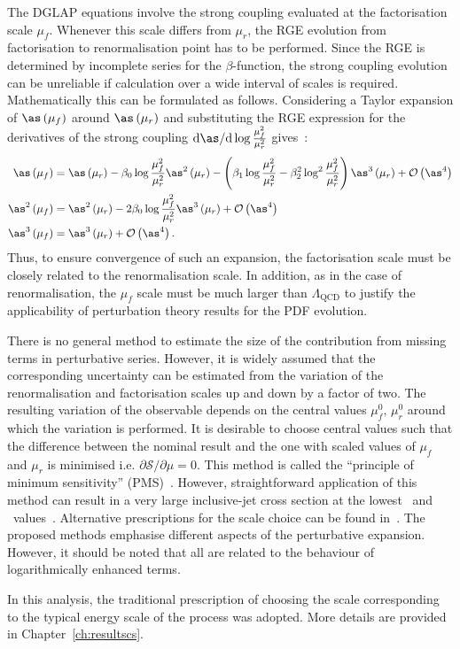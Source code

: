 The DGLAP equations involve the strong coupling evaluated at the factorisation scale $\mu_f$. Whenever this scale differs from $\mu_r$, the RGE evolution from factorisation to renormalisation point has to be performed. Since the RGE is determined by incomplete series for the $\beta$-function, the strong coupling evolution can be unreliable if calculation over a wide interval of scales is required. Mathematically this can be formulated as follows. Considering a Taylor expansion of $\as\left(\mu_f\right)$ around $\as\left(\mu_r\right)$ and substituting the RGE expression for the derivatives of the strong coupling $\mathrm{d}\as/\mathrm{d}\log{\frac{\mu_f^2}{\mu_r^2}}$ gives~\cite{Botje:2010ay}:
{\small
\begin{align}
 \as\left(\mu_f\right) &= \as\left(\mu_r\right) - \beta_0\log{\frac{\mu_f^2}{\mu_r^2}}\as^2\left(\mu_r\right) - \left(\beta_1\log{\frac{\mu_f^2}{\mu_r^2}} - \beta_2^2\log^2{\frac{\mu_f^2}{\mu_r^2}}\right)\as^3\left(\mu_r\right) + \mathcal{O}\left(\as^4\right)\\ \nonumber
 \as^2\left(\mu_f\right) & = \as^2\left(\mu_r\right) - 2\beta_0\log{\frac{\mu_f^2}{\mu_r^2}}\as^3\left(\mu_r\right) + \mathcal{O}\left(\as^4\right)\\
\as^3\left(\mu_f\right) & = \as^3\left(\mu_r\right) + \mathcal{O}\left(\as^4\right).
\end{align}
}
Thus, to ensure convergence of such an expansion, the factorisation scale must be closely related to the renormalisation scale. In addition, as in the case of renormalisation, the $\mu_f$ scale must be much larger than $\Lambda_\mathrm{QCD}$ to justify the applicability of perturbation theory results for the PDF evolution.

There is no general method to estimate the size of the contribution from missing terms in perturbative series. However, it is widely assumed that the corresponding uncertainty can be estimated from the variation of the renormalisation and factorisation scales up and down by a factor of two. The resulting variation of the observable depends on the central values $\mu_{f}^{0},\,\mu_{r}^{0}$ around which the variation is performed. It is desirable to choose central values such that the difference between the nominal result and the one with scaled values of $\mu_f$ and $\mu_r$ is minimised i.e. $\partial\mathcal{S}/\partial\mu=0$. This method is called the ``principle of minimum sensitivity'' (PMS)~\cite{Stevenson:1980du}. However, straightforward application of this method can result in a very large inclusive-jet cross section at the lowest \qsq~and \etjet~values~\cite{thesis:britzger:2013}. Alternative prescriptions for the scale choice can be found in~\cite{Ioffe:2010zz}. The proposed methods emphasise different aspects of the perturbative expansion. However, it should be noted that all are related to the behaviour of logarithmically enhanced terms.

In this analysis, the traditional prescription of choosing the scale corresponding to the typical energy scale of the process was adopted. More details are provided in Chapter~\ref{ch:resultscs}.
